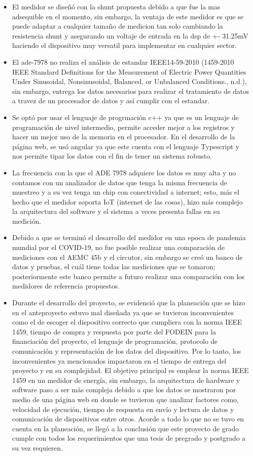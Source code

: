 \begin{itemize}
    \item El medidor se diseñó con la shunt propuesta debido a que fue la mas adsequible en el momento, sin embargo, la ventaja de este medidor es que se puede adaptar a cualquier tamaño de medicion tan solo cambiando la resistencia shunt y asegurando un voltaje de entrada en la dsp de +- 31.25mV haciendo el dispositivo muy versatil para implementar en cualquier sector.
    \item El ade-7978 no realiza el análisis de estandar IEEE14-59-2010 (1459-2010 IEEE Standard Definitions for the Measurement of Electric Power Quantities Under Sinusoidal, Nonsinusoidal, Balanced, or Unbalanced Conditions., n.d.), sin embargo, entrega los datos necesarios para realizar el tratamiento de datos a travez de un procesador de datos y así cumplir con el estandar.
    \item Se optó por usar el lenguaje de progrmación c++ ya que es un lenguaje de programación de nivel intermedio, permite acceder mejor a los registros y hacer un mejor uso de la memoria en el procesador. En el desarrollo de la página web, se usó angular ya que este cuenta con el lenguaje Typescript y nos permite tipar los datos con el fin de tener un sistema robusto.
    \item La frecuencia con la que el ADE 7978 adquiere los datos es muy alta y no contamos con un analizador de datos que tenga la misma frecuencia de muestreo y a su vez tenga un chip con conectividad a internet; esto, más el hecho que el medidor soporta IoT (internet de las cosas), hizo más complejo la arquitectura del software y el sistema a veces presenta fallas en su medición.
    \item Debido a que se terminó el desarrollo del medidor en una epoca de pandemia mundial por el COVID-19, no fue posible realizar una comparación de mediciones con el AEMC 45b y el circutor, sin embargo se creó un banco de datos y pruebas, el cuál tiene todas las mediciones que se tomaron; posteriormente este banco permite a futuro realizar una comparación con los medidores de referencia propuestos.
    \item Durante el desarrollo del proyecto, se evidenció que la planeación que se hizo en el anteproyecto estuvo mal diseñada ya que se tuvieron inconvenientes como el de escoger el dispositivo correcto que cumpliera con la norma IEEE 1459, tiempo de compra y respuesta por parte del FODEIN para la financiación del proyecto, el lenguaje de programación, protocolo de comunicación y representación de los datos del dispositivo. Por lo tanto, los inconvenientes ya mencionados impactaron en el tiempo de entrega del proyecto y en su complejidad. El objetivo principal es emplear la norma IEEE 1459 en un medidor de energía, sin embargo, la arquitectura de hardware y software paso a ser más compleja debido a que los datos se mostraron por medio de una página web en donde se tuvieron que analizar factores como, velocidad de ejecución, tiempo de respuesta en envío y lectura de datos y comunicación de dispositivos entre otros. Acorde a todo lo que no se tuvo en cuenta en la planeación, se llegó a la conclusión que este proyecto de grado cumple con todos los requerimientos que una tesis de pregrado y postgrado a su vez requieren.



\end{itemize}
